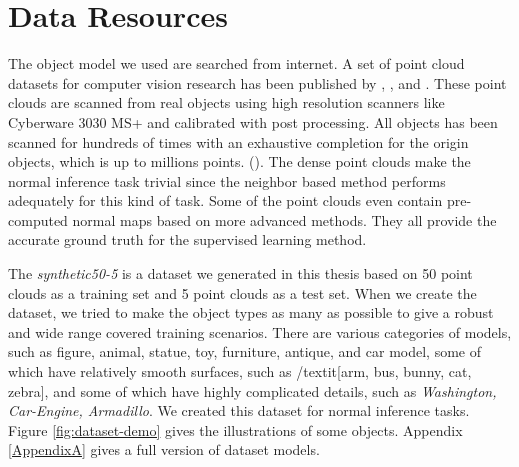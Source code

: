 \section{Data Resources}
The object model we used are searched from internet.
A set of point cloud datasets for computer vision research has been published by \cite{data1}, \cite{data2}, \cite{data3} and \cite{data4}. These point clouds are scanned from real objects using high resolution scanners like Cyberware 3030 MS+ and calibrated with post processing. All objects has been scanned for hundreds of times with an exhaustive completion for the origin objects, which is up to millions points. (\cite{data1}). The dense point clouds make the normal inference task trivial since the neighbor based method performs adequately for this kind of task. Some of the point clouds even contain pre-computed normal maps based on more advanced methods. They all provide the accurate ground truth for the supervised learning method.

The \textit{synthetic50-5} is a dataset we generated in this thesis based on 50 point clouds as a training set and 5 point clouds as a test set. When we create the dataset, we tried to make the object types as many as possible to give a robust and wide range covered training scenarios. There are various categories of models, such as figure, animal, statue, toy, furniture, antique, and car model, some of which have relatively smooth surfaces, such as /textit[arm, bus, bunny, cat, zebra], and some of which have highly complicated details, such as \textit{Washington, Car-Engine, Armadillo}. 
We created this dataset for normal inference tasks. Figure \ref{fig:dataset-demo} gives the illustrations of some objects. Appendix \ref{AppendixA} gives a full version of dataset models.


